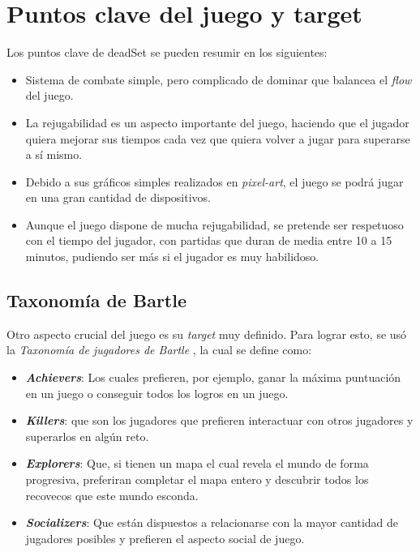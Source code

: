 \documentclass[11pt]{article}
\begin{document}
\section{Puntos clave del juego y target}
    Los puntos clave de \textunderscore deadSet se pueden resumir en los siguientes: 
    \begin{itemize}
        \item Sistema de combate simple, pero complicado de dominar que balancea el \textit{flow} del juego.
        \item La rejugabilidad es un aspecto importante del juego, haciendo que el jugador quiera mejorar sus tiempos cada vez que quiera volver a jugar para superarse a sí mismo. 
        \item Debido a sus gráficos simples realizados en \textit{pixel-art}, el juego se podrá jugar en una gran cantidad de dispositivos. 
        \item Aunque el juego dispone de mucha rejugabilidad, se pretende ser respetuoso con el tiempo del jugador, con partidas que duran de media entre 10 a 15 minutos, pudiendo ser más si el jugador es muy habilidoso. 
    \end{itemize}
        
        \subsection{Taxonomía de Bartle}
            Otro aspecto crucial del juego es su \textit{target} muy definido. Para lograr esto, se usó la \textit{Taxonomía de jugadores de Bartle} \cite{bartle}, la cual se define como: 
                \begin{itemize}
                    \item \textit{\textbf{Achievers}}: Los cuales prefieren, por ejemplo,  ganar la máxima puntuación en un juego o conseguir todos los logros en un juego. 
                    \item \textit{\textbf{Killers}}: que son los jugadores que prefieren interactuar con otros jugadores y superarlos en algún reto.
                    \item \textit{\textbf{Explorers}}: Que, si tienen un mapa el cual revela el mundo de forma progresiva, preferiran completar el mapa entero y descubrir todos los recovecos que este mundo esconda.
                    \item \textit{\textbf{Socializers}}: Que están dispuestos a relacionarse con la mayor cantidad de jugadores posibles y prefieren el aspecto social de juego. 
                \end{itemize}
    
\end{document}
